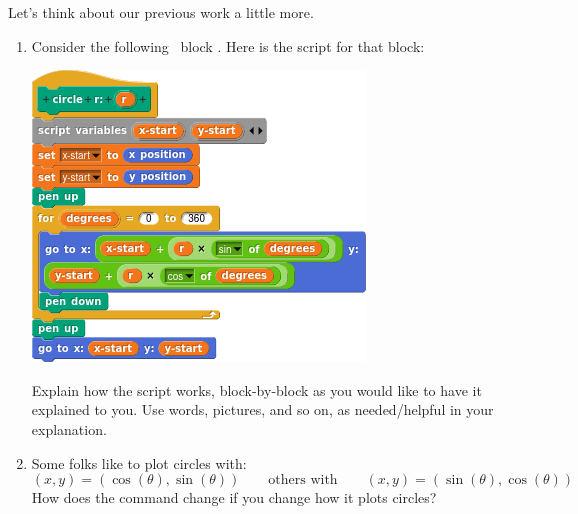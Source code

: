\documentclass[noauthor,nooutcomes,handout]{ximera}
\begin{document}
\begin{question}
  Let's think about our previous work a little more.
  \begin{enumerate}
  \item Consider the following \snap\ block . Here is the script for that block:
    \begin{center}
      \includegraphics{../sineAndCosine/circleScript.png}
    \end{center}
    Explain how the script works, block-by-block as you would like to
    have it explained to you. Use words, pictures, and so on, as
    needed/helpful in your explanation.
  \item Some folks like to plot circles with:
    \[
    (x,y) = (\cos(\theta),\sin(\theta)) \qquad\text{others with}\qquad  (x,y) = (\sin(\theta),\cos(\theta))
    \]
    How does the command  change if you change how it plots circles?
  

\end{enumerate}
\end{question}
\end{document}
